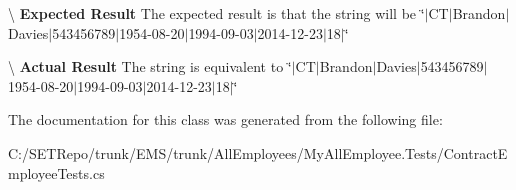 \textbackslash{} {\bfseries  Expected Result} The expected result is that the string will be \char`\"{}$\vert$\+C\+T$\vert$\+Brandon$\vert$\+Davies$\vert$543456789$\vert$1954-\/08-\/20$\vert$1994-\/09-\/03$\vert$2014-\/12-\/23$\vert$18$\vert$\char`\"{}

\textbackslash{} {\bfseries  Actual Result} The string is equivalent to \char`\"{}$\vert$\+C\+T$\vert$\+Brandon$\vert$\+Davies$\vert$543456789$\vert$1954-\/08-\/20$\vert$1994-\/09-\/03$\vert$2014-\/12-\/23$\vert$18$\vert$\char`\"{} 

The documentation for this class was generated from the following file\+:\begin{DoxyCompactItemize}
\item 
C\+:/\+S\+E\+T\+Repo/trunk/\+E\+M\+S/trunk/\+All\+Employees/\+My\+All\+Employee.\+Tests/Contract\+Employee\+Tests.\+cs\end{DoxyCompactItemize}
